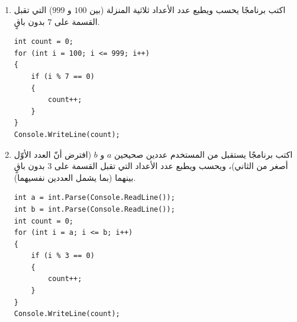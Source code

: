 \documentclass[14pt]{extarticle}
\begin{document}
\begin{enumerate}[resume, itemsep=1em]
{\begin{tabular}{|C{0.8cm}|p{6.6cm}|C{0.8cm}|p{6.6cm}|}
\begin{pycell}
\begin{english}
\begin{verbatim}
    if (n > 1.80)
    {
        count++;
    }
}
Console.WriteLine(count);
\end{verbatim}
\end{english}
\end{pycell}
\\ \hline
\end{tabular}
\par}
\ifwithsols
\begin{boxSolution}
\begin{itemize}[nosep]
    \item \textbf{المقطع الصحيح هو} $\mathbf{C}$.
    \item \textbf{الخطأ في} $\mathbf{A}$: تم تصفير \textenglish{count = 0} وطباعته داخل الحلقة في كل دورة بدلاً من خارجها.
    \item \textbf{الخطأ في} $\mathbf{B}$: عند تحقّق الشرط زاد عدّاد الحلقة \textenglish{i++} بدلاً من زيادة عدّاد الطلاب \textenglish{count++}.
    \item \textbf{الخطأ في} $\mathbf{D}$: تم استقبال الطول $n$ مرّة واحدة فقط قبل الحلقة بدلاً من استقباله داخل الحلقة لكل طالب من الـ $40$.
\end{itemize}
\end{boxSolution}
\fi
\filbreak

\item اكتب برنامجًا يحسب ويطبع عدد الأعداد ثلاثية المنزلة (بين $100$ و $999$) التي تقبل القسمة على $7$ بدون باقٍ.
\ifwithsols
\begin{boxSolution}
\begin{english}
\begin{verbatim}
int count = 0;
for (int i = 100; i <= 999; i++)
{
    if (i % 7 == 0)
    {
        count++;
    }
}
Console.WriteLine(count);
\end{verbatim}
\end{english}
\end{boxSolution}
\fi
\filbreak

\item اكتب برنامجًا يستقبل من المستخدم عددين صحيحين $a$ و $b$ (افترض أنّ العدد الأوّل أصغر من الثاني)، ويحسب ويطبع عدد الأعداد التي تقبل القسمة على $3$ بدون باقٍ بينهما (بما يشمل العددين نفسيهما).
\ifwithsols
\begin{boxSolution}
\begin{english}
\begin{verbatim}
int a = int.Parse(Console.ReadLine());
int b = int.Parse(Console.ReadLine());
int count = 0;
for (int i = a; i <= b; i++)
{
    if (i % 3 == 0)
    {
        count++;
    }
}
Console.WriteLine(count);
\end{verbatim}
\end{english}
\end{boxSolution}
\fi
\filbreak


\end{enumerate}
\end{document}
